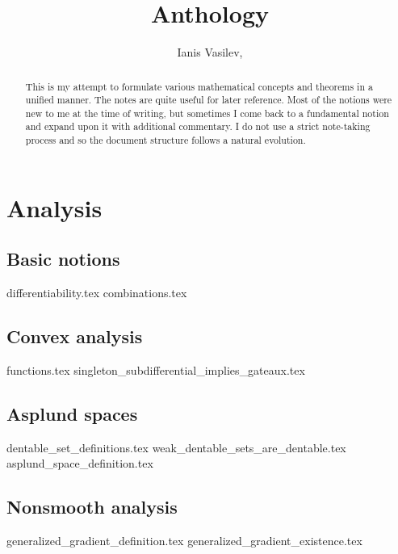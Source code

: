 \documentclass[numbers=endperiod, bibliography=totocnumbered]{scrartcl}
\title{Anthology}
\author{Ianis Vasilev, \Email{ianis@ivasilev.net}}
\date{}
\begin{document}
\maketitle

\begin{abstract}
  This is my attempt to formulate various mathematical concepts and theorems in a unified manner. The notes are quite useful for later reference. Most of the notions were new to me at the time of writing, but sometimes I come back to a fundamental notion and expand upon it with additional commentary. I do not use a strict note-taking process and so the document structure follows a natural evolution.
\end{abstract}

\tableofcontents

\section{Analysis}
\subsection{Basic notions}
{differentiability.tex}
{combinations.tex}

\subsection{Convex analysis}
{functions.tex}
{singleton_subdifferential_implies_gateaux.tex}

\subsection{Asplund spaces}
{dentable_set_definitions.tex}
{weak_dentable_sets_are_dentable.tex}
{asplund_space_definition.tex}

\subsection{Nonsmooth analysis}
{generalized_gradient_definition.tex}
{generalized_gradient_existence.tex}


\printbibliography
\end{document}
